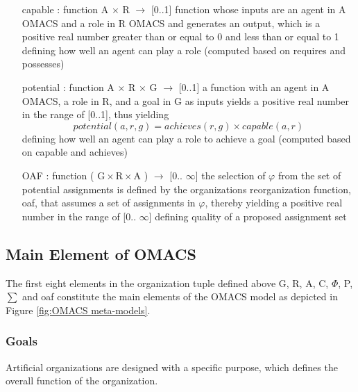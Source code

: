 \begin{itemize}
\newcommand{\localtextbulletone}{\textcolor{gray}{\raisebox{.45ex}{\rule{.6ex}{.6ex}}}}
\renewcommand{\labelitemi}{\localtextbulletone}
\item[capable] 
: function A $\times$ R $\rightarrow$ {[}0..1{]} function whose inputs are an agent in A OMACS
and a role in R OMACS and generates an output, which is a positive real number greater than or equal to 0 
and less than or equal to 1
defining how well an agent can play a role (computed based on requires and possesses)

\item[potential]
: function A $\times$ R $\times$ G $\rightarrow$ {[}0..1{]} a function with an agent in A OMACS,
a role in R, and a goal in G as inputs yields a positive real number in the range of {[}0..1{]}, 
thus yielding	
\begin{equation}
potential(a,r,g)=achieves(r,g)\times capable(a,r) \label{eq:potential equation}
\end{equation}
defining how well an agent can play a role to achieve a goal (computed based on capable and achieves)

\item[ OAF ] 
: function ( $ \textrm{G} \times \textrm{R} \times \textrm{A} $ ) $\rightarrow$ {[}0.. $\infty${]} 
the selection of $\varphi$ from the set of potential assignments is defined by the organizations reorganization function,
 oaf, that assumes a set of assignments in $\varphi$,
thereby yielding a positive real number in the range of {[}0.. $\infty${]}
defining quality of a proposed assignment set




\end{itemize}

\subsection{Main Element of OMACS}

The first eight elements in the organization tuple defined above G, R, A, C, $\varPhi$, P, $\sum$ and oaf constitute the main elements of the OMACS model as depicted in Figure \ref{fig:OMACS meta-models}.

\subsubsection{Goals}

Artificial organizations are designed with a specific purpose, which defines the overall function
of the organization\cite{omacs2}.

